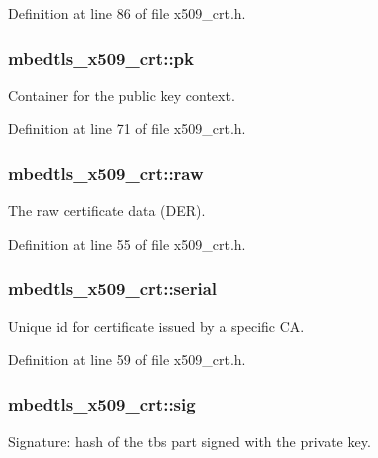 Definition at line 86 of file x509\-\_\-crt.\-h.

\hypertarget{structmbedtls__x509__crt_a64f66291338e6b230542d83035fe5f20}{
\subsubsection[{pk}]{ mbedtls\-\_\-x509\-\_\-crt\-::pk}}\label{structmbedtls__x509__crt_a64f66291338e6b230542d83035fe5f20}
Container for the public key context. 

Definition at line 71 of file x509\-\_\-crt.\-h.

\hypertarget{structmbedtls__x509__crt_a5bfef6b8b81bc081f796cb1f6bb28839}{
\subsubsection[{raw}]{ mbedtls\-\_\-x509\-\_\-crt\-::raw}}\label{structmbedtls__x509__crt_a5bfef6b8b81bc081f796cb1f6bb28839}
The raw certificate data (D\-E\-R). 

Definition at line 55 of file x509\-\_\-crt.\-h.

\hypertarget{structmbedtls__x509__crt_a5c3ae8b4aba6e1c40cb1f6a85da36116}{
\subsubsection[{serial}]{ mbedtls\-\_\-x509\-\_\-crt\-::serial}}\label{structmbedtls__x509__crt_a5c3ae8b4aba6e1c40cb1f6a85da36116}
Unique id for certificate issued by a specific C\-A. 

Definition at line 59 of file x509\-\_\-crt.\-h.

\hypertarget{structmbedtls__x509__crt_aea76ebaa8c8e23129bd905cdc0242a3a}{
\subsubsection[{sig}]{ mbedtls\-\_\-x509\-\_\-crt\-::sig}}\label{structmbedtls__x509__crt_aea76ebaa8c8e23129bd905cdc0242a3a}
Signature\-: hash of the tbs part signed with the private key. 

